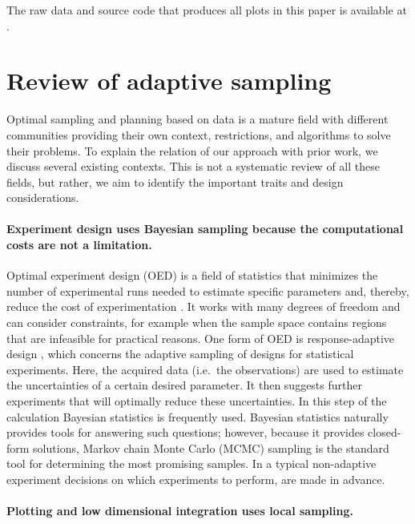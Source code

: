 The raw data and source code that produces all plots in this paper is available at \cite{papercode}.

\hypertarget{sec:review}{%
\section{Review of adaptive sampling}\label{sec:review}}

Optimal sampling and planning based on data is a mature field with different communities providing their own context, restrictions, and algorithms to solve their problems.
To explain the relation of our approach with prior work, we discuss several existing contexts.
This is not a systematic review of all these fields, but rather, we aim to identify the important traits and design considerations.

\hypertarget{experiment-design-uses-bayesian-sampling-because-the-computational-costs-are-not-a-limitation.}{%
\paragraph{Experiment design uses Bayesian sampling because the computational costs are not a limitation.}\label{experiment-design-uses-bayesian-sampling-because-the-computational-costs-are-not-a-limitation.}}

Optimal experiment design (OED) is a field of statistics that minimizes the number of experimental runs needed to estimate specific parameters and, thereby, reduce the cost of experimentation \cite{Emery1998}.
It works with many degrees of freedom and can consider constraints, for example when the sample space contains regions that are infeasible for practical reasons.
One form of OED is response-adaptive design \cite{Hu2006}, which concerns the adaptive sampling of designs for statistical experiments.
Here, the acquired data (i.e.~the observations) are used to estimate the uncertainties of a certain desired parameter.
It then suggests further experiments that will optimally reduce these uncertainties.
In this step of the calculation Bayesian statistics is frequently used.
Bayesian statistics naturally provides tools for answering such questions; however, because it provides closed-form solutions, Markov chain Monte Carlo (MCMC) sampling is the standard tool for determining the most promising samples.
In a typical non-adaptive experiment decisions on which experiments to perform, are made in advance.

\hypertarget{plotting-and-low-dimensional-integration-uses-local-sampling.}{%
\paragraph{Plotting and low dimensional integration uses local sampling.}\label{plotting-and-low-dimensional-integration-uses-local-sampling.}}

